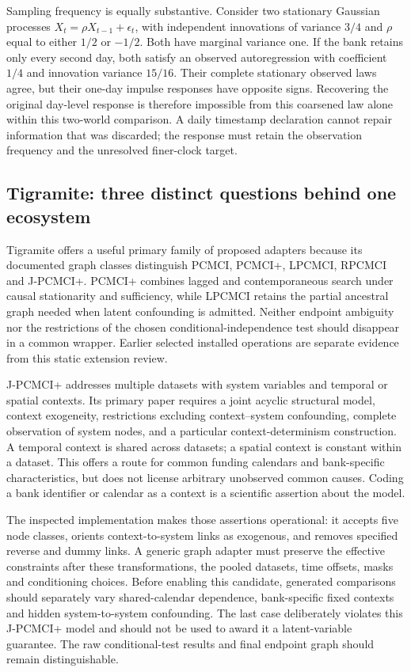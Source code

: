 Sampling frequency is equally substantive. Consider two stationary Gaussian
processes $X_t=\rho X_{t-1}+\epsilon_t$, with independent innovations of
variance $3/4$ and $\rho$ equal to either $1/2$ or $-1/2$. Both have marginal
variance one. If the bank retains only every second day, both satisfy an
observed autoregression with coefficient $1/4$ and innovation variance
$15/16$. Their complete stationary observed laws agree, but their one-day
impulse responses have opposite signs. Recovering the original day-level
response is therefore impossible from this coarsened law alone within this
two-world comparison. A daily timestamp declaration cannot repair information
that was discarded; the response must retain the observation frequency and
the unresolved finer-clock target. \citep{exec14_pt_exact}

\subsection{Tigramite: three distinct questions behind one ecosystem}

Tigramite offers a useful primary family of proposed adapters because its
documented graph classes distinguish PCMCI, PCMCI+, LPCMCI, RPCMCI and
J-PCMCI+. PCMCI+ combines lagged and contemporaneous search under causal
stationarity and sufficiency, while LPCMCI retains the partial ancestral
graph needed when latent confounding is admitted. Neither endpoint
ambiguity nor the restrictions of the chosen conditional-independence test
should disappear in a common wrapper. Earlier selected installed operations
are separate evidence from this static extension review.
\citep{runge2020,gerhardus2020,runtime_tigramite_scope,exec14_pt_tigramite}

J-PCMCI+ addresses multiple datasets with system variables and temporal or
spatial contexts. Its primary paper requires a joint acyclic structural
model, context exogeneity, restrictions excluding context--system
confounding, complete observation of system nodes, and a particular
context-determinism construction. A temporal context is shared across
datasets; a spatial context is constant within a dataset. This offers a
route for common funding calendars and bank-specific characteristics, but
does not license arbitrary unobserved common causes. Coding a bank identifier
or calendar as a context is a scientific assertion about the model.
\citep{exec14_pt_paper_jpcmci}

The inspected implementation makes those assertions operational: it accepts
five node classes, orients context-to-system links as exogenous, and removes
specified reverse and dummy links. A generic graph adapter must preserve the
effective constraints after these transformations, the pooled datasets, time
offsets, masks and conditioning choices. Before enabling this candidate,
generated comparisons should separately vary shared-calendar dependence,
bank-specific fixed contexts and hidden system-to-system confounding. The
last case deliberately violates this J-PCMCI+ model and should not be used
to award it a latent-variable guarantee. The raw conditional-test results
and final endpoint graph should remain distinguishable.
\citep{exec14_pt_tigramite,exec14_pt_contract}

